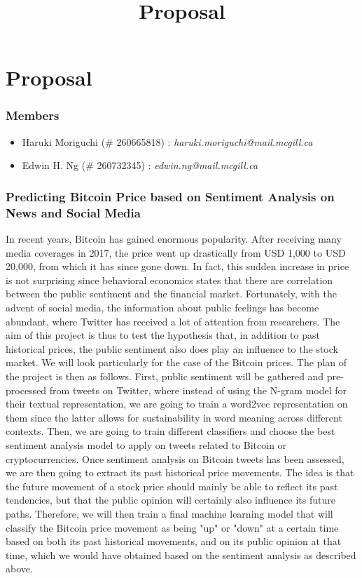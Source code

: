 \documentclass[12pt,a4paper]{report}
\begin{document}
\title{Proposal\\
}


\setcounter{page}{1}
\thispagestyle{empty} 


\chapter*{Proposal}
\subsection*{Members}
\begin{itemize}
\item Haruki Moriguchi (\# 260665818) : \textit{haruki.moriguchi@mail.mcgill.ca}
\item Edwin H. Ng (\# 260732345) : \textit{edwin.ng@mail.mcgill.ca}
\end{itemize}

\subsection*{Predicting Bitcoin Price based on Sentiment Analysis on News and Social Media}
\par \qquad In recent years, Bitcoin has gained enormous popularity. After receiving many media coverages in 2017, the  price went up drastically from USD 1,000 to USD 20,000, from which it has since gone down. In fact, this sudden increase in price is not surprising since behavioral economics states that there are correlation between the public sentiment and the financial market. Fortunately, with the advent of social media, the information about public feelings has become abundant, where Twitter has received a lot of attention from researchers. The aim of this project is thus to test the hypothesis that, in addition to past historical prices, the public sentiment also does play an influence to the stock market. We will look particularly for the case of the Bitcoin prices. The plan of the project is then as follows. First, public sentiment will be gathered and pre-processed from tweets on Twitter, where instead of using the N-gram model for their textual representation, we are going to train a word2vec representation on them since the latter allows for sustainability in word meaning across different contexts. Then, we are going to train different classifiers and choose the best sentiment analysis model to apply on tweets related to Bitcoin or cryptocurrencies. Once sentiment analysis on Bitcoin tweets has been assessed, we are then going to extract its past historical price movements. The idea is that the future movement of a stock price should mainly be able to reflect its past tendencies, but that the public opinion will certainly also influence its future paths. Therefore, we will then train a final machine learning model that will classify the Bitcoin price movement as being "up" or "down" at a certain time based on both its past historical movements, and on its public opinion at that time, which we would have obtained based on the sentiment analysis as described above.
\\
\end{document}
